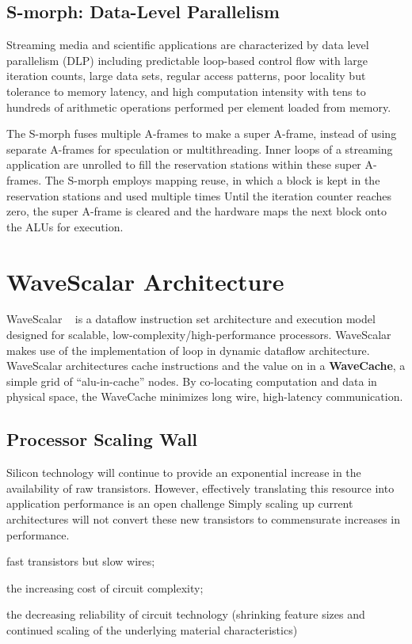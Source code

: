 \documentclass[UTF8,12pt,a4paper]{article}
\begin{document}
\subsection{S-morph: Data-Level Parallelism}
Streaming media and scientific applications are characterized by data level parallelism (DLP)
including predictable loop-based control flow with large iteration counts,
large data sets, regular access patterns, poor locality but tolerance to memory latency,
and high computation intensity with tens to hundreds of arithmetic operations performed per element loaded from memory.

The S-morph fuses multiple A-frames to make a super A-frame,
instead of using separate A-frames for speculation or multithreading.
Inner loops of a streaming application are unrolled
to fill the reservation stations within these super A-frames.
The S-morph employs mapping reuse, in which a block is kept in the reservation stations and used multiple times
Until the iteration counter reaches zero, the super A-frame is cleared
and the hardware maps the next block onto the ALUs for execution.

\clearpage

\section{WaveScalar Architecture}
WaveScalar ~\cite{DBLP:conf/micro/SwansonMSO03}\cite{DBLP:journals/tocs/SwansonSMPPMOE07}
is a dataflow instruction set architecture and execution model designed for scalable,
low-complexity/high-performance processors.
WaveScalar makes use of the implementation of loop in dynamic dataflow architecture.
WaveScalar architectures cache instructions and the value on in a \textbf{WaveCache},
a simple grid of ``alu-in-cache'' nodes.
By co-locating computation and data in physical space,
the WaveCache minimizes long wire, high-latency communication.

\subsection{Processor Scaling Wall}
Silicon technology will continue to provide an exponential increase in the availability of raw transistors.
However, effectively translating this resource into application performance is an open challenge
Simply scaling up current architectures will not convert these new transistors to commensurate increases in performance.

\begin{compactitem}
  \item fast transistors but slow wires;
  \item the increasing cost of circuit complexity;
  \item  the decreasing reliability of circuit technology (shrinking feature sizes
  and continued scaling of the underlying material characteristics)
\end{compactitem}
\end{document}

